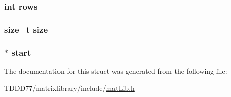 \subsubsection[{rows}]{\setlength{\rightskip}{0pt plus 5cm}int rows}\label{structmatrix_a061459acc9e078fa4699e0e349887215}
\hypertarget{structmatrix_a854352f53b148adc24983a58a1866d66}{}
\subsubsection[{size}]{\setlength{\rightskip}{0pt plus 5cm}size\+\_\+t size}\label{structmatrix_a854352f53b148adc24983a58a1866d66}
\hypertarget{structmatrix_a34f549255e7222691d5c0d1160ea26f1}{}
\subsubsection[{start}]{$\ast$ start}\label{structmatrix_a34f549255e7222691d5c0d1160ea26f1}


The documentation for this struct was generated from the following file\+:\begin{DoxyCompactItemize}
\item 
T\+D\+D\+D77/matrixlibrary/include/\hyperlink{mat_lib_8h}{mat\+Lib.\+h}\end{DoxyCompactItemize}
